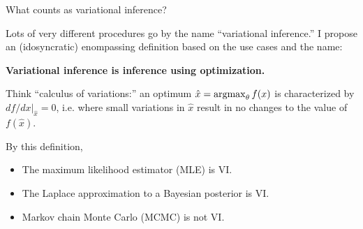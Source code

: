 

\begin{frame}{What counts as variational inference?}

Lots of very different procedures go by the name ``variational inference.''
%
I propose an (idosyncratic) enompassing definition based on the use cases and
the name:

\begin{center}
\textbf{Variational inference is inference
using optimization.}
\end{center}

%
Think ``calculus of variations:'' an optimum $\hat{x} = \operatorname*{\mathrm{argmax}}_\theta f(x)$ is
characterized by $df / dx |_{\hat{x}} = 0$, i.e.  where small variations in
$\hat{x}$ result in no changes to the value of $f(\hat{x})$.
%

\begin{center}
\end{center}


\begin{minipage}[t]{0.2\textwidth}
By this definition,
\end{minipage}
%
\begin{minipage}[t]{0.8\textwidth}
    \vspace{-0.65em}
\begin{itemize}
    \item The maximum likelihood estimator (MLE) is VI.
    \item The Laplace approximation to a Bayesian posterior is VI.
    \item Markov chain Monte Carlo (MCMC) is not VI.
\end{itemize}
\end{minipage}
\hspace{-2em}

\end{frame}


